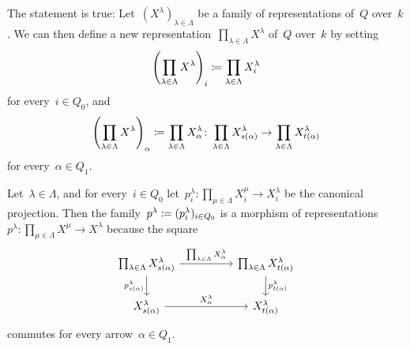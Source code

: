 \subsection{}

The statement is true:
Let~$(X^\lambda)_{\lambda \in \Lambda}$ be a family of representations of~$Q$ over~$k$.
We can then define a new representation~$\prod_{\lambda \in \Lambda} X^\lambda$ of~$Q$ over~$k$ by setting
\[
            \left( \prod_{\lambda \in \Lambda} X^\lambda \right)_i
  \coloneqq  \prod_{\lambda \in \Lambda} X^\lambda_i
\]
for every~$i \in Q_0$, and
\[
            \left( \prod_{\lambda \in \Lambda} X^\lambda \right)_\alpha
  \coloneqq  \prod_{\lambda \in \Lambda} X^\lambda_\alpha
  \colon    \prod_{\lambda \in \Lambda} X^\lambda_{s(\alpha)}
  \to       \prod_{\lambda \in \Lambda} X^\lambda_{t(\alpha)}
\]
for every~$\alpha \in Q_1$.

Let~$\lambda \in \Lambda$, and for every~$i \in Q_0$ let~$p^\lambda_i \colon \prod_{\mu \in \Lambda} X^\mu_i \to X^\lambda_i$ be the canonical projection.
Then the family~$p^\lambda \coloneqq (p^\lambda_i)_{i \in Q_0}$ is a morphism of representations~$p^\lambda \colon \prod_{\mu \in \Lambda} X^\mu \to X^\lambda$ because the square
\[
  \begin{tikzcd}[column sep = huge]
      \prod_{\lambda \in \Lambda} X^\lambda_{s(\alpha)}
      \arrow{r}[above]{\prod_{\lambda \in \Lambda} X^\lambda_\alpha}
      \arrow{d}[left]{p^\lambda_{s(\alpha)}}
    & \prod_{\lambda \in \Lambda} X^\lambda_{t(\alpha)}
      \arrow{d}[right]{p^\lambda_{t(\alpha)}}
    \\
      X^\lambda_{s(\alpha)}
      \arrow{r}[above]{X^\lambda_\alpha}
    & X^\lambda_{t(\alpha)}
  \end{tikzcd}
\]
commutes for every arrow~$\alpha \in Q_1$.

